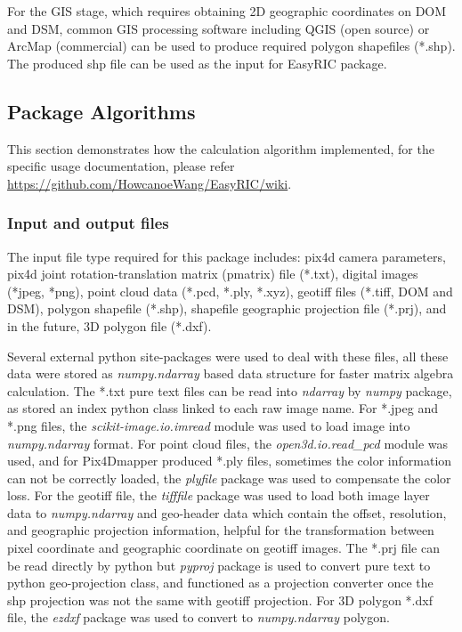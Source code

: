 \documentclass[doublespacing]{configs/bmcart}
\begin{document}
For the GIS stage, which requires obtaining 2D geographic coordinates on DOM and DSM, common GIS processing software including QGIS (open source) or ArcMap (commercial) can be used to produce required polygon shapefiles (*.shp). The produced shp file can be used as the input for EasyRIC package.

\subsection*{Package Algorithms}
This section demonstrates how the calculation algorithm implemented, for the specific usage documentation, please refer \url{https://github.com/HowcanoeWang/EasyRIC/wiki}.

\subsubsection*{Input and output files}
The input file type required for this package includes: pix4d camera parameters, pix4d joint rotation-translation matrix (pmatrix) file (*.txt), digital images (*jpeg, *png), point cloud data (*.pcd, *.ply, *.xyz), geotiff files (*.tiff, DOM and DSM), polygon shapefile (*.shp), shapefile geographic projection file (*.prj), and in the future, 3D polygon file (*.dxf).

Several external python site-packages were used to deal with these files, all these data were stored as \textit{numpy.ndarray} based data structure for faster matrix algebra calculation. The *.txt pure text files can be read into \textit{ndarray} by \textit{numpy} package, as stored an index python class linked to each raw image name. For *.jpeg and *.png files, the \textit{scikit-image.io.imread} module was used to load image into \textit{numpy.ndarray} format. For point cloud files, the \textit{open3d.io.read\_pcd} module was used, and for Pix4Dmapper produced *.ply files, sometimes the color information can not be correctly loaded, the \textit{plyfile} package was used to compensate the color loss. For the geotiff file, the \textit{tifffile} package was used to load both image layer data to \textit{numpy.ndarray} and geo-header data which contain the offset, resolution, and geographic projection information, helpful for the transformation between pixel coordinate and geographic coordinate on geotiff images. The *.prj file can be read directly by python but \textit{pyproj} package is used to convert pure text to python geo-projection class, and functioned as a projection converter once the shp projection was not the same with geotiff projection. For 3D polygon *.dxf file, the \textit{ezdxf} package was used to convert to \textit{numpy.ndarray} polygon.
\end{document}
